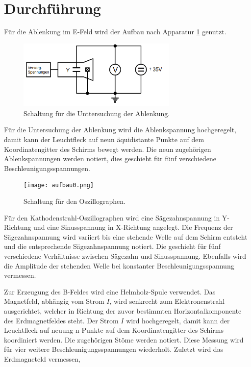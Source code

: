 \section{Durchführung}
\label{sec:Durchführung}
Für die Ablenkung im E-Feld wird der Aufbau nach Apparatur \ref{fig:aufbauE} genutzt.
\begin{figure}
 \centering
 \includegraphics[width=0.7\textwidth]{aufbauE.png}
 \caption{Schaltung für die Unttersuchung der Ablenkung.}
 \label{fig:aufbauE}
\end{figure}
Für die Untersuchung der Ablenkung wird die Ablenkspannung hochgeregelt, damit kann der Leuchtfleck
auf neun äquidistante Punkte auf dem Koordinatengitter des Schirms bewegt werden. Die neun zugehörigen
Ablenkspannungen werden notiert, dies geschieht für fünf verschiedene Beschleunigungsspannungen.
\begin{figure}
 \centering
 \texttt{[image: aufbau0.png]}
 \caption{Schaltung für den Oszillographen.}
 \label{fig:aufbauO}
\end{figure}
Für den Kathodenstrahl-Oszillographen wird eine Sägezahnspannung in Y-Richtung und eine Sinusspannung
in X-Richtung angelegt. Die Frequenz der Sägezahnspannung wird variiert bis eine stehende Welle auf dem Schirm entsteht
und die entsprechende Sägezahnspannung notiert.
Die geschieht für fünf verschiedene Verhältnisse zwischen Sägezahn-und Sinusspannung.
Ebenfalls wird die Amplitude der stehenden Welle bei konstanter Beschleunigungsspannung vermessen.

Zur Erzeugung des B-Feldes wird eine Helmholz-Spule verwendet. Das Magnetfeld, abhängig vom Strom $I$,
wird senkrecht zum Elektronenstrahl ausgerichtet, welcher in Richtung der zuvor bestimmten Horizontalkomponente
des Erdmagnetfeldes steht. Der Strom $I$ wird hochgeregelt, damit kann der Leuchtfleck auf neuung n Punkte
auf dem Koordinatengitter des Schirms koordiniert werden. Die zugehörigen Stöme werden notiert.
Diese Messung wird für vier weitere Beschleunigungsspannungen wiederholt.
Zuletzt wird das Erdmagneteld vermessen,

